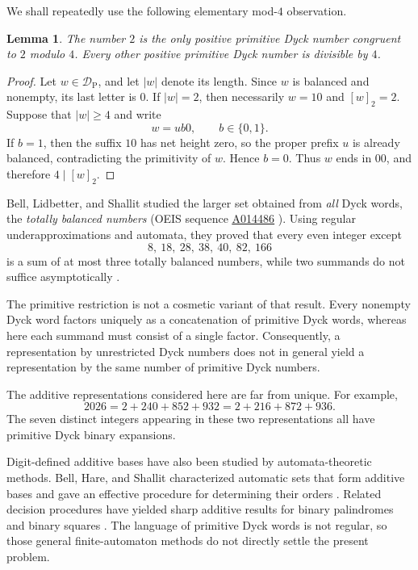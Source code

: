 \documentclass[12pt]{article}
\theoremstyle{plain}
\newtheorem{lemma}[theorem]{Lemma}
\theoremstyle{definition}
\theoremstyle{plain}
\newcommand{\DP}{\mathcal{D}_{\mathrm{P}}}
\newcommand{\seqnum}[1]{\href{https://oeis.org/#1}{\rm \underline{#1}}}
\begin{document}
We shall repeatedly use the following elementary mod-$4$ observation.

\begin{lemma}\label{lem:mod4}
The number $2$ is the only positive primitive Dyck number congruent to
$2$ modulo $4$.  Every other positive primitive Dyck number is divisible
by $4$.
\end{lemma}

\begin{proof}
Let $w\in\DP$, and let $|w|$ denote its length.  Since $w$ is balanced and
nonempty, its last letter is $0$.  If $|w|=2$, then necessarily $w=10$ and
$[w]_2=2$.  Suppose that $|w|\geq4$ and write
\[
 w=ub0,\qquad b\in\{0,1\}.
\]
If $b=1$, then the suffix $10$ has net height zero, so the proper prefix
$u$ is already balanced, contradicting the primitivity of $w$.  Hence
$b=0$.  Thus $w$ ends in $00$, and therefore $4\mid[w]_2$.
\end{proof}

Bell, Lidbetter, and Shallit studied the larger set obtained from
\emph{all} Dyck words, the \emph{totally balanced numbers} (OEIS sequence
\seqnum{A014486} \cite{OEIS-A014486}).  Using regular underapproximations and automata,
they proved that every even integer except
\[
        8,\ 18,\ 28,\ 38,\ 40,\ 82,\ 166
\]
is a sum of at most three totally balanced numbers, while two summands
do not suffice asymptotically \cite[Thm.\ 14]{BLS}.

The primitive restriction is not a cosmetic variant of that result.
Every nonempty Dyck word factors uniquely as a concatenation of
primitive Dyck words, whereas here each summand must consist of a single
factor.  Consequently, a representation by unrestricted Dyck numbers
does not in general yield a representation by the same number of
primitive Dyck numbers.

The additive representations considered here are far from unique.  For
example,
\[
 2026=2+240+852+932=2+216+872+936.
\]
The seven distinct integers appearing in these two representations all
have primitive Dyck binary expansions.

Digit-defined additive bases have also been studied by automata-theoretic
methods.  Bell, Hare, and Shallit characterized automatic sets that form
additive bases and gave an effective procedure for determining their
orders \cite{BHS}.  Related decision procedures have yielded sharp
additive results for binary palindromes \cite{RSS} and binary squares
\cite{MNRS}.  The language of primitive Dyck words is not regular, so
those general finite-automaton methods do not directly settle the
present problem.
\end{document}
